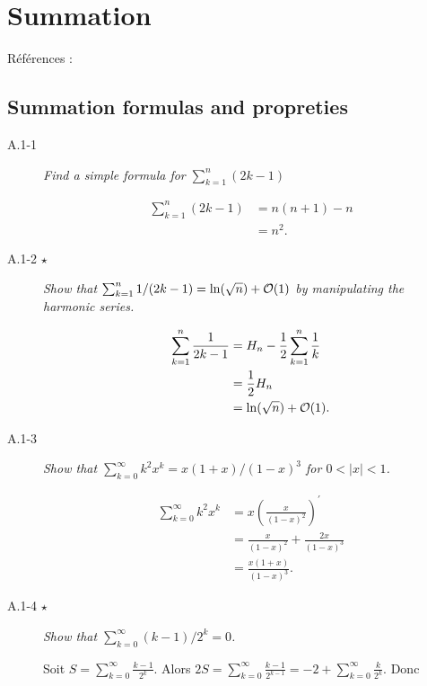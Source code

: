 \section{Summation}

R\'ef\'erences : \cite{uic_hw1}

\subsection{Summation formulas and propreties}

\begin{description}
  \item [A.1-1] {\itshape Find a simple formula for $\sum_{k=1}^n(2k-1)$ }
   \begin{ex}
  \begin{align*}
    \sum_{k=1}^n(2k-1)  & = n(n+1)-n\\
    &= n^2.
  \end{align*}
\end{ex}
\item[A.1-2 $\star$]  {\itshape Show that $\sum_{k=1}^n1/(2k-1) = \ln (\sqrt{n}) + \mathcal{O}(1)$ by manipulating the harmonic series.}
    \begin{ex}
      \begin{align*}
        \sum_{k=1}^n \frac{1}{2k-1} &= H_n - \frac{1}{2}\sum_{k=1}^n\frac{1}{k}\\
       &= \frac{1}{2}H_n\\
       &= \ln(\sqrt{n}) + \mathcal{O}(1).
      \end{align*}
    \end{ex}
  \item[A.1-3] {\itshape Show that $\sum_{k=0}^{\infty} k^2x^k = x(1+x)/(1-x)^3$ for $ 0 < |x| < 1$.}
    \begin{ex}
    \begin{align*}
  \sum_{k=0}^\infty k^2x^k & = x \left( \frac{x}{(1-x)^2} \right)^\prime\\
      &= \frac{x}{(1-x)^2}+\frac{2x}{(1-x)^3}\\
      &= \frac{x(1+x)}{(1-x)^3}.
    \end{align*}
  \end{ex}
\item[A.1-4 $\star$] {\itshape Show that $\sum^\infty_{k=0}(k-1)/2^k = 0$.}
    \begin{ex}
    Soit $S=\sum_{k=0}^\infty\frac{k-1}{2^k}$. Alors $2S = \sum_{k=0}^{\infty}\frac{k-1}{2^{k-1}}= -2 + \sum_{k=0}^\infty\frac{k}{2^k}$. Donc 
    \begin{align*}

\end{align*}
\end{ex}
\end{description}
